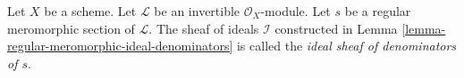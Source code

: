 \begin{definition}
\label{definition-regular-meromorphic-ideal-denominators}
Let $X$ be a scheme.
Let $\mathcal{L}$ be an invertible $\mathcal{O}_X$-module.
Let $s$ be a regular meromorphic section of $\mathcal{L}$.
The sheaf of ideals $\mathcal{I}$ constructed in
Lemma \ref{lemma-regular-meromorphic-ideal-denominators}
is called the {\it ideal sheaf of denominators of $s$}.
\end{definition}